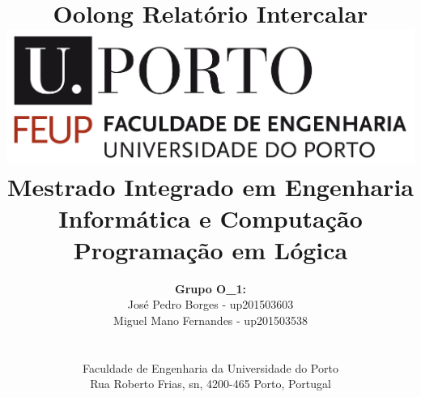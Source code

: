 \documentclass[a4paper]{article}
\begin{document}
\setlength{\textwidth}{16cm}
\setlength{\textheight}{22cm}

\title{\Huge\textbf{Oolong}\linebreak\linebreak\linebreak
\Large\textbf{Relatório Intercalar}\linebreak\linebreak
\linebreak\linebreak
\includegraphics[scale=0.1]{feup-logo.png}\linebreak\linebreak
\linebreak\linebreak
\Large{Mestrado Integrado em Engenharia Informática e Computação} \linebreak\linebreak
\Large{Programação em Lógica}\linebreak
}

\author{\textbf{Grupo O\_1:}\\
José Pedro Borges - up201503603 \\
Miguel Mano Fernandes - up201503538 \\
\linebreak\linebreak \\
 \\ Faculdade de Engenharia da Universidade do Porto \\ Rua Roberto Frias, s\/n, 4200-465 Porto, Portugal \linebreak\linebreak\linebreak
\linebreak\linebreak\vspace{1cm}}

\maketitle
\thispagestyle{empty}
\end{document}
